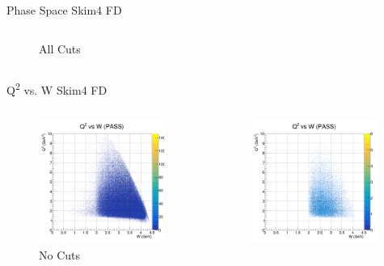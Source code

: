 \documentclass[aspectratio=169]{beamer}
\begin{document}
\begin{frame}{Phase Space  \hfill Skim4 FD}
\begin{columns}
\begin{figure}
        \caption{All Cuts}
    \end{figure}
    \end{columns}
\end{frame}

\begin{frame}{Q\textsuperscript{2} vs. W  \hfill Skim4 FD}
\vspace*{-0.6cm}
    \begin{columns}
    \begin{figure}
        \centering
        \includegraphics[width=0.97\textwidth]{pdfs/hists/PASS/q2w.png}
        \caption{No Cuts}
    \end{figure}
    \begin{figure}
        \centering
        \includegraphics[width=0.97\textwidth]{pdfs/all_cuts/PASS/q2w.png}

\end{figure}
\end{columns}
\end{frame}
\end{document}
